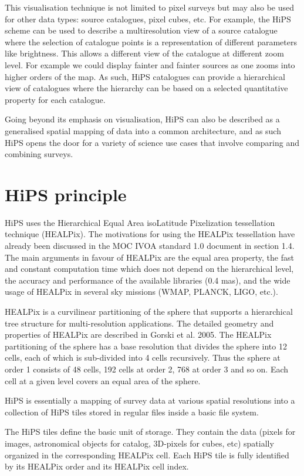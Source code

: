 \documentclass[11pt,a4paper]{ivoa}
\begin{document}
This visualisation technique is not limited to pixel surveys but may also be used for other data types: source catalogues, pixel cubes, etc. For example, the HiPS scheme can be used to describe a multiresolution view of a source catalogue where the selection of catalogue points is a representation of different parameters like brightness. This allows a different view of the catalogue at different zoom level. For example we could display fainter and fainter sources as one zooms into higher orders of the map. As such, HiPS catalogues can provide a hierarchical view of catalogues where the hierarchy can be based on a selected quantitative property for each catalogue.

Going beyond its emphasis on visualisation, HiPS can also be described as a generalised spatial mapping of data into a common architecture, and as such HiPS opens the door for a variety of science use cases that involve comparing and combining surveys.

\section{HiPS principle}

HiPS uses the Hierarchical Equal Area isoLatitude Pixelization tessellation technique (HEALPix). The motivations for using the HEALPix tessellation have already been discussed in the MOC IVOA standard 1.0 document in section 1.4. The main arguments in favour of HEALPix are the equal area property, the fast and constant computation time which does not depend on the hierarchical level, the accuracy and performance of the available libraries (0.4 mas), and the wide usage of HEALPix in several sky missions (WMAP, PLANCK, LIGO, etc.).

HEALPix is a curvilinear partitioning of the sphere that supports a hierarchical tree structure for multi-resolution applications. The detailed geometry and properties of HEALPix are described in Gorski et al. 2005. The HEALPix partitioning of the sphere has a base resolution that divides the sphere into 12 cells, each of which is sub-divided into 4 cells recursively. Thus the sphere at order 1 consists of 48 cells, 192 cells at order 2, 768 at order 3 and so on. Each cell at a given level covers an equal area of the sphere.

HiPS is essentially a mapping of survey data at various spatial resolutions into a collection of HiPS tiles stored in regular files inside a basic file system. 

The HiPS tiles define the basic unit of storage. They contain the data (pixels for images, astronomical objects for catalog, 3D-pixels for cubes, etc) spatially organized in the corresponding HEALPix cell. Each HiPS tile is fully identified by its HEALPix order and its HEALPix cell index.
\end{document}

